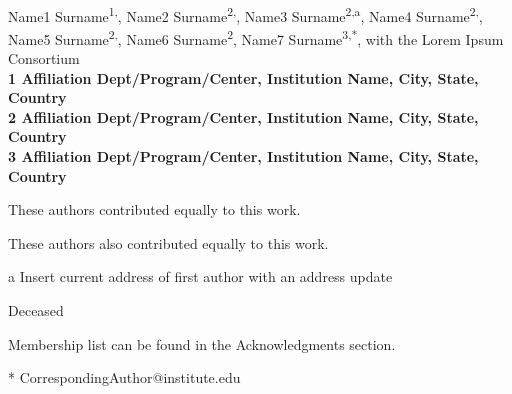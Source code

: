 \documentclass[10pt,letterpaper]{article}
\date{}
\begin{document}
\vspace*{0.35in}

\begin{flushleft}
{\Large
\textbf{}
}
\newline
\\
Name1 Surname\textsuperscript{1,\Yinyang},
Name2 Surname\textsuperscript{2,\Yinyang},
Name3 Surname\textsuperscript{2,\textcurrency a},
Name4 Surname\textsuperscript{2,\ddag},
Name5 Surname\textsuperscript{2,\ddag},
Name6 Surname\textsuperscript{2},
Name7 Surname\textsuperscript{3,*},
with the Lorem Ipsum Consortium\textsuperscript{\textpilcrow}
\\
\bigskip
\bf{1} Affiliation Dept/Program/Center, Institution Name, City, State, Country
\\
\bf{2} Affiliation Dept/Program/Center, Institution Name, City, State, Country
\\
\bf{3} Affiliation Dept/Program/Center, Institution Name, City, State, Country
\\
\bigskip

% 
%
\Yinyang These authors contributed equally to this work.

\ddag These authors also contributed equally to this work.

\textcurrency a Insert current address of first author with an address update

\dag Deceased

\textpilcrow Membership list can be found in the Acknowledgments section.

* CorrespondingAuthor@institute.edu

\end{flushleft}
\end{document}
